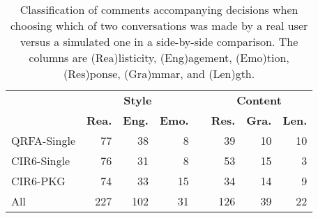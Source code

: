 \begin{table}[t]
	\caption{Classification of comments accompanying decisions when choosing which of two conversations was made by a real user versus a simulated one in a side-by-side comparison.  The columns are (Rea)listicity, (Eng)agement, (Emo)tion, (Res)ponse, (Gra)mmar, and (Len)gth.}
	\captionshrink
	\begin{tabular}{lrrrlrrr}
	\toprule
	& \multicolumn{3}{c}{\textbf{Style}} && \multicolumn{3}{c}{\textbf{Content}} \\
	\cline{2-4} 	\cline{6-8}
	 &\textbf{Rea.} & \textbf{Eng.} & \textbf{Emo.} &&
	 \textbf{Res.} & \textbf{Gra.} & \textbf{Len.} \\
	\midrule
	QRFA-Single &
		77 & 38 & 8 &&
		39 & 10 & 10  \\
	CIR6-Single &
		76 & 31 & 8 &&
		53 & 15 & 3  \\
	CIR6-PKG &
		74 & 33 & 15 &&
		34 & 14 & 9  \\
	\midrule
	All &
		227 & 102 & 31 &&
		126 & 39 & 22 \\
	\bottomrule
	\end{tabular}
	\shrink
\label{tbl:anay}
\end{table}
